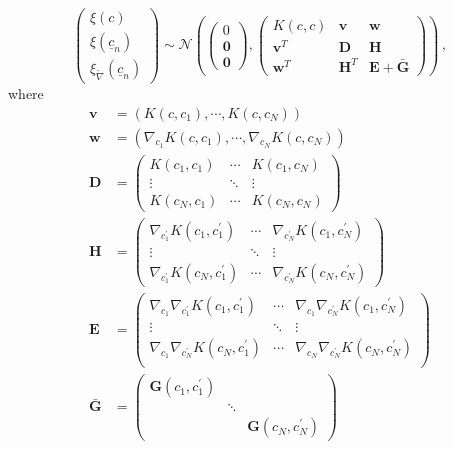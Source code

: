 \documentclass[a4paper,onecolumn]{article}
\theoremstyle{remark}
\begin{document}
\begin{equation}
    \begin{pmatrix}
        \xi(c) \\ \xi(\underline{c}_n) \\ \xi_{\tilde{\nabla}}(\underline{c}_n)
    \end{pmatrix}
    \sim
    \mathcal{N}\left(
    \begin{pmatrix}
        0\\
        \textbf{0}\\
        \boldsymbol{0}
    \end{pmatrix} ,
    \begin{pmatrix}
        K(c,c) & \mathbf{v} & \mathbf{w}\\
        \mathbf{v}^T & \mathbf{D} & \mathbf{H}\\
        \mathbf{w}^T & \mathbf{H}^T & \mathbf{E} +\bar{\mathbf{G}}
    \end{pmatrix}
    \right)\,,
    \label{joint dis}
\end{equation}
where
\begin{equation}\begin{split}
    \mathbf{v} & = \left(K(c, c_1), \cdots, K(c,c_N) \right)\\
    \mathbf{w} & = \left(\nabla_{c_1} K(c, c_1),\cdots, \nabla_{c_N} K(c, c_N) \right)\\
    \mathbf{D} & = \begin{pmatrix}
        K(c_1, c_1) & \cdots & K(c_1, c_N) \\
        \vdots & \ddots & \vdots \\
        K(c_N, c_1) & \cdots & K(c_N, c_N)
    \end{pmatrix}\\
    \mathbf{H} & = \begin{pmatrix}
        \nabla_{c_1^\prime} K(c_1, c_1^\prime) & \cdots & \nabla_{c_N^\prime} K(c_1, c_N^\prime) \\
        \vdots & \ddots & \vdots\\
        \nabla_{c_1^\prime} K(c_N, c_1^\prime) & \cdots & \nabla_{c_N^\prime} K(c_N, c_N^\prime) 
    \end{pmatrix}\\
    \mathbf{E} & =
    \begin{pmatrix}
        \nabla_{c_1} \nabla_{c_1^\prime} K(c_1, c_1^\prime) & \cdots &
        \nabla_{c_1} \nabla_{c_N^\prime} K(c_1, c_N^\prime)\\
        \vdots & \ddots & \vdots \\
        \nabla_{c_1} \nabla_{c_N^\prime} K(c_N, c_1^\prime) & \cdots &
        \nabla_{c_N} \nabla_{c_N^\prime} K(c_N, c_N^\prime)\\
    \end{pmatrix}\\
    \bar{\mathbf{G}} & =
    \begin{pmatrix}
        \mathbf{G}(c_1, c_1^\prime) & &\\
        & \ddots & \\
        & & \mathbf{G}(c_N, c_N^\prime)
    \end{pmatrix}
\end{split}
\end{equation}
\end{document}
